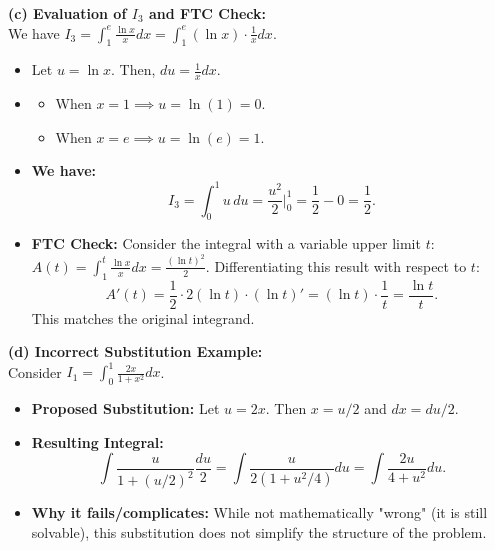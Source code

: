 \textbf{(c) Evaluation of $I_3$ and FTC Check:} \\
    We have $I_3 = \int_{1}^{e} \frac{\ln x}{x} dx = \int_{1}^{e} (\ln x) \cdot \frac{1}{x} dx$.
    \begin{itemize}
        \item Let $u = \ln x$. Then, $du = \frac{1}{x} dx$.
        \item
        \begin{itemize}
            \item When $x = 1 \implies u = \ln(1) = 0$.
            \item When $x = e \implies u = \ln(e) = 1$.
        \end{itemize}
        \item \textbf{We have:}
        \[
        I_3 = \int_{0}^{1} u \, du = \frac{u^2}{2} \Big|_{0}^{1} = \frac{1}{2} - 0 = \frac{1}{2}.
        \]
        \item \textbf{FTC Check:} Consider the integral with a variable upper limit $t$: $A(t) = \int_{1}^{t} \frac{\ln x}{x} dx = \frac{(\ln t)^2}{2}$.
        Differentiating this result with respect to $t$:
        \[
        A'(t) = \frac{1}{2} \cdot 2(\ln t) \cdot (\ln t)' = (\ln t) \cdot \frac{1}{t} = \frac{\ln t}{t}.
        \]
        This matches the original integrand.
    \end{itemize}

\textbf{(d) Incorrect Substitution Example:} \\
    Consider $I_1 = \int_{0}^{1} \frac{2x}{1+x^2} dx$.
    \begin{itemize}
        \item \textbf{Proposed Substitution:} Let $u = 2x$. Then $x = u/2$ and $dx = du/2$.
        \item \textbf{Resulting Integral:}
        \[
        \int \frac{u}{1 + (u/2)^2} \frac{du}{2} = \int \frac{u}{2(1 + u^2/4)} du = \int \frac{2u}{4 + u^2} du.
        \]
        \item \textbf{Why it fails/complicates:} While not mathematically "wrong" (it is still solvable), this substitution does not simplify the structure of the problem. 
    \end{itemize}
\pagebreak